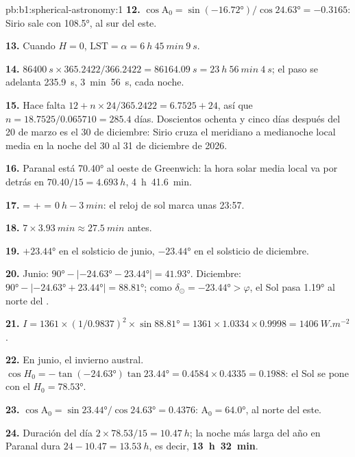 \begin{solution}{pb:b1:spherical-astronomy:1}
\textbf{12.} $\cos\mathrm{A}_0 = \sin(\ang{-16.72})/\cos\ang{24.63} =
-0.3165$: Sirio sale con  \ang{108.5}, al sur del este.

\textbf{13.} Cuando $H = 0$, $\mathrm{LST} = \alpha = \qty{6}{h}~\qty{45}{min}~\qty{9}{s}$.

\textbf{14.} $\qty{86400}{s}\times365.2422/366.2422 = \qty{86164.09}{s} =
\qty{23}{h}~\qty{56}{min}~\qty{4}{s}$; el paso se adelanta
\qty{235.9}{s}, \qty{3}{min}~\qty{56}{s}, cada noche.

\textbf{15.} Hace falta $12 + n\times24/365.2422 = 6.7525 + 24$, así que
$n = 18.7525/0.065710 = 285.4$ días. Doscientos ochenta y cinco días después del 20
de marzo es el 30 de diciembre: Sirio cruza el meridiano a medianoche local media
en la noche del 30 al 31 de diciembre de 2026.

\textbf{16.} Paranal está \ang{70.40} al oeste de Greenwich: la hora solar media
local va por detrás en $70.40/15 = \qty{4.693}{h}$, \qty{4}{h}~\qty{41.6}{min}.

\textbf{17.}  =  +  =
$\qty{0}{h} - \qty{3}{min}$: el reloj de sol marca unas 23:57.

\textbf{18.} $7\times\qty{3.93}{min} \approx \qty{27.5}{min}$ antes.

\textbf{19.} $+\ang{23.44}$ en el solsticio de junio, $-\ang{23.44}$ en el solsticio
de diciembre.

\textbf{20.} Junio: $\ang{90} - |\ang{-24.63} - \ang{23.44}| = \ang{41.93}$.
Diciembre: $\ang{90} - |\ang{-24.63} + \ang{23.44}| = \ang{88.81}$; como
$\delta_\odot = \ang{-23.44} > \varphi$, el Sol pasa \ang{1.19} al norte del .

\textbf{21.} $I = 1361\times(1/0.9837)^2\times\sin\ang{88.81} = 1361\times
1.0334\times0.9998 = \qty{1406}{W.m^{-2}}$.

\textbf{22.} En junio, el invierno austral. $\cos H_0 = -\tan(\ang{-24.63})
\tan\ang{23.44} = 0.4584\times0.4335 = 0.1988$: el Sol se pone con el  $H_0 = \ang{78.53}$.

\textbf{23.} $\cos\mathrm{A}_0 = \sin\ang{23.44}/\cos\ang{24.63} = 0.4376$:
$\mathrm{A}_0 = \ang{64.0}$, al norte del este.

\textbf{24.} Duración del día $2\times78.53/15 = \qty{10.47}{h}$; la noche más larga
del año en Paranal dura $24 - 10.47 = \qty{13.53}{h}$, es decir,
\textbf{\qty[text-series-to-math=true]{13}{h}~\qty[text-series-to-math=true]{32}{min}}.
\end{solution}
